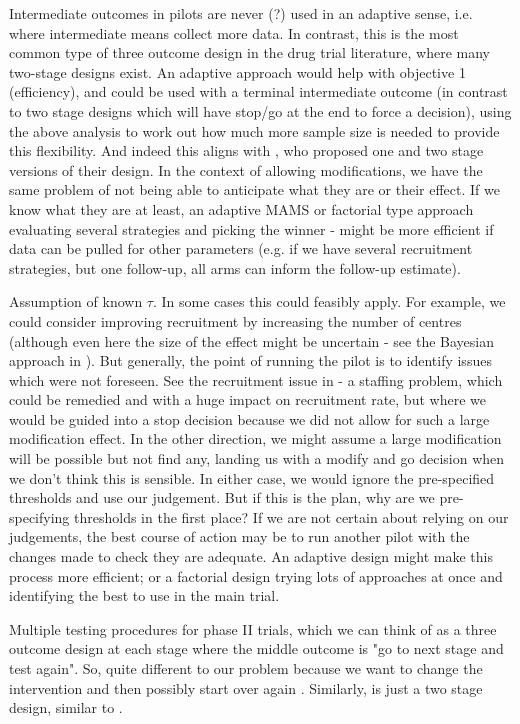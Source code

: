 \documentclass[Crown, times, sagev]{sagej}
\begin{document}
Intermediate outcomes in pilots are never (?) used in an adaptive sense, i.e. where intermediate means collect more data. In contrast, this is the most common type of three outcome design in the drug trial literature, where many two-stage designs exist. An adaptive approach would help with objective 1 (efficiency), and could be used with a terminal intermediate outcome (in contrast to two stage designs which will have stop/go at the end to force a decision), using the above analysis to work out how much more sample size is needed to provide this flexibility. And indeed this aligns with \cite{Sargent2001}, who proposed one and two stage versions of their design. In the context of allowing modifications, we have the same problem of not being able to anticipate what they are or their effect. If we know what they are at least, an adaptive MAMS or factorial type approach evaluating several strategies and picking the winner - might be more efficient if data can be pulled for other parameters (e.g. if we have several recruitment strategies, but one follow-up, all arms can inform the follow-up estimate).

Assumption of known $\tau$. In some cases this could feasibly apply. For example, we could consider improving recruitment by increasing the number of centres (although even here the size of the effect might be uncertain - see the Bayesian approach in \cite{Hampson2017}). But generally, the point of running the pilot is to identify issues which were not foreseen. See the recruitment issue in \cite{Avery2017} - a staffing problem, which could be remedied and with a huge impact on recruitment rate, but where we would be guided into a stop decision because we did not allow for such a large modification effect. In the other direction, we might assume a large modification will be possible but not find any, landing us with a modify and go decision when we don't think this is sensible. In either case, we would ignore the pre-specified thresholds and use our judgement. But if this is the plan, why are we pre-specifying thresholds in the first place? If we are not certain about relying on our judgements, the best course of action may be to run another pilot with the changes made to check they are adequate. An adaptive design might make this process more efficient; or a factorial design trying lots of approaches at once and identifying the best to use in the main trial.


Multiple testing procedures for phase II trials, which we can think of as a three outcome design at each stage where the middle outcome is "go to next stage and test again". So, quite different to our problem because we want to change the intervention and then possibly start over again \cite{Fleming1982}. Similarly, \cite{Shuster2002} is just a two stage design, similar to \cite{Simon1989}. 
\end{document}
